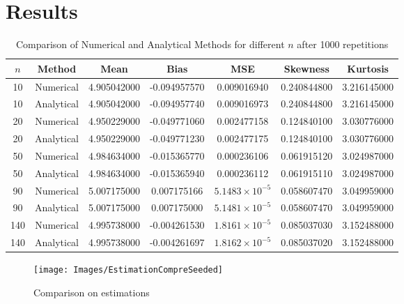 \documentclass{report}
\begin{document}
\section{Results}\label{sec:results}
\begin{table}[h]
    \centering
    \begin{tabular}{| c | c | c | c | c | c | c |}
        \hline
        $n$ & Method     & Mean        & Bias         & MSE                     & Skewness    & Kurtosis    \\
        \hline
        10  & Numerical  & 4.905042000 & -0.094957570 & 0.009016940             & 0.240844800 & 3.216145000 \\
        10  & Analytical & 4.905042000 & -0.094957740 & 0.009016973             & 0.240844800 & 3.216145000 \\
        \hline
        20  & Numerical  & 4.950229000 & -0.049771060 & 0.002477158             & 0.124840100 & 3.030776000 \\
        20  & Analytical & 4.950229000 & -0.049771230 & 0.002477175             & 0.124840100 & 3.030776000 \\
        \hline
        50  & Numerical  & 4.984634000 & -0.015365770 & 0.000236106             & 0.061915120 & 3.024987000 \\
        50  & Analytical & 4.984634000 & -0.015365940 & 0.000236112             & 0.061915110 & 3.024987000 \\
        \hline
        90  & Numerical  & 5.007175000 & 0.007175166  & $5.1483 \times 10^{-5}$ & 0.058607470 & 3.049959000 \\
        90  & Analytical & 5.007175000 & 0.007175000  & $5.1481 \times 10^{-5}$ & 0.058607470 & 3.049959000 \\
        \hline
        140 & Numerical  & 4.995738000 & -0.004261530 & $1.8161 \times 10^{-5}$ & 0.085037030 & 3.152488000 \\
        140 & Analytical & 4.995738000 & -0.004261697 & $1.8162 \times 10^{-5}$ & 0.085037020 & 3.152488000 \\
        \hline
    \end{tabular}
    \caption{Comparison of Numerical and Analytical Methods for different $n$ after 1000 repetitions}\label{tab:table}
\end{table}

\begin{figure}[H]
    \centering
    \texttt{[image: Images/EstimationCompreSeeded]}
    \caption{Comparison on estimations}
    \label{fig:Estimations}
\end{figure}
\end{document}
